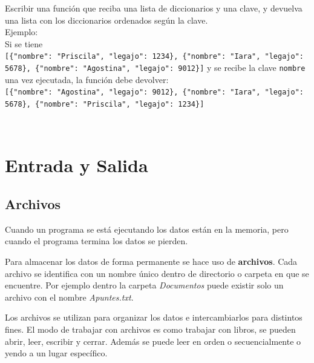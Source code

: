 \documentclass[
  letterpaper,
  DIV=11,
  numbers=noendperiod]{scrreprt}
\begin{document}
\begin{tcolorbox}[enhanced jigsaw, opacitybacktitle=0.6, toptitle=1mm, toprule=.15mm, arc=.35mm, breakable, bottomrule=.15mm, opacityback=0, leftrule=.75mm, rightrule=.15mm, title=\textcolor{quarto-callout-important-color}{\faExclamation}\hspace{0.5em}{Ejercicio Desafío}, left=2mm, bottomtitle=1mm, colframe=quarto-callout-important-color-frame, colback=white, titlerule=0mm, coltitle=black, colbacktitle=quarto-callout-important-color!10!white]

Escribir una función que reciba una lista de diccionarios y una clave, y
devuelva una lista con los diccionarios ordenados según la clave.\\

Ejemplo:\\
Si se tiene
\texttt{{[}\{"nombre":\ "Priscila",\ "legajo":\ 1234\},\ \{"nombre":\ "Iara",\ "legajo":\ 5678\},\ \{"nombre":\ "Agostina",\ "legajo":\ 9012\}{]}}
y se recibe la clave \texttt{nombre}\\
una vez ejecutada, la función debe devolver:\\
\texttt{{[}\{"nombre":\ "Agostina",\ "legajo":\ 9012\},\ \{"nombre":\ "Iara",\ "legajo":\ 5678\},\ \{"nombre":\ "Priscila",\ "legajo":\ 1234\}{]}}\strut \\

\end{tcolorbox}


\chapter{Entrada y Salida}\label{entrada-y-salida}

\section{Archivos}\label{archivos}

Cuando un programa se está ejecutando los datos están en la memoria,
pero cuando el programa termina los datos se pierden.

Para almacenar los datos de forma permanente se hace uso de
\textbf{archivos}. Cada archivo se identifica con un nombre único dentro
de directorio o carpeta en que se encuentre. Por ejemplo dentro la
carpeta \emph{Documentos} puede existir solo un archivo con el nombre
\emph{Apuntes.txt}.

Los archivos se utilizan para organizar los datos e intercambiarlos para
distintos fines. El modo de trabajar con archivos es como trabajar con
libros, se pueden abrir, leer, escribir y cerrar. Además se puede leer
en orden o secuencialmente o yendo a un lugar específico.
\end{document}
